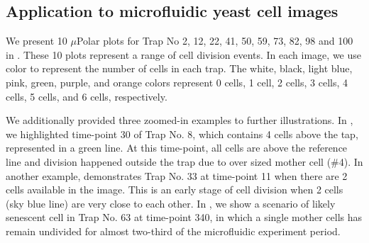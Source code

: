 \documentclass[conference]{IEEEtran}
\begin{document}

\subsection{Application to  microfluidic yeast cell images}
We present 10 $\mu$Polar plots for Trap No 2, 12, 22, 41, 50, 59, 73, 82, 98 and 100 in . These 10 plots represent a range of cell division events. 
In each image, we use color to represent the number of cells in each trap. 
The white, black, light blue, pink, green, purple, and orange colors represent 0 cells, 1 cell, 2 cells, 3 cells, 4 cells, 5 cells, and 6 cells, respectively.

We additionally provided three zoomed-in examples to further illustrations.  
In , we highlighted time-point 30 of Trap No. 8, which contains 4 cells above the tap, represented in a green line. 
At this time-point, all cells are above the reference line and division happened outside the trap due to over sized mother cell (\#4). In another example,  demonstrates Trap No. 33 at time-point 11 when there are 2 cells available in the image. This is an early stage of cell division when 2 cells (sky blue line) are very close to each other.  In , we show a  scenario of likely senescent cell in Trap No. 63 at time-point 340, in which a single mother cells  has remain undivided for almost two-third of the microfluidic experiment period.
\end{document}
